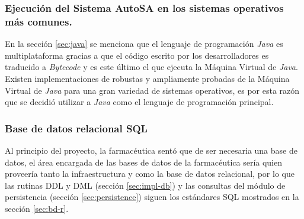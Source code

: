 \subsubsection{Ejecución del Sistema AutoSA en los sistemas operativos más comunes.}
En la sección \ref{sec:java} se menciona que el lenguaje de programación \textit{Java} es multiplataforma gracias a que el código escrito por los desarrolladores es traducido a \textit{Bytecode} y es este último el que ejecuta la Máquina Virtual de \textit{Java}. Existen implementaciones de robustas y ampliamente probadas de la Máquina Virtual de \textit{Java} para una gran variedad de sistemas operativos, es por esta razón que se decidió utilizar a \textit{Java} como el lenguaje de programación principal.

\subsubsection{Base de datos relacional SQL}
Al principio del proyecto, la farmacéutica sentó que de ser necesaria una base de datos, el área encargada de las bases de datos de la farmacéutica sería quien proveería tanto la infraestructura y como la base de datos relacional, por lo que las rutinas DDL y DML (sección \ref{sec:impl-db}) y las consultas del módulo de persistencia (sección \ref{sec:persistence}) siguen los estándares SQL mostrados en la sección \ref{sec:bd-r}.

